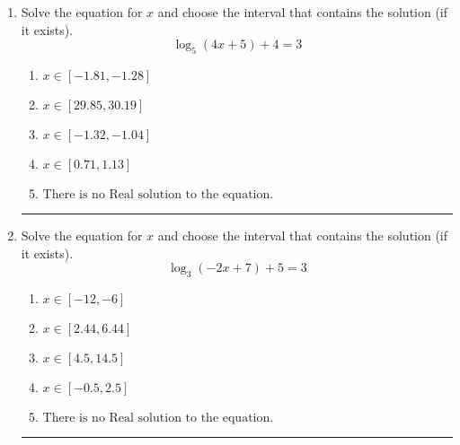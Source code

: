 \documentclass[14pt]{extbook}
\newcommand{\litem}[1]{\item#1\hspace*{-1cm}\rule{\textwidth}{0.4pt}}
\begin{document}
\begin{enumerate}
{\begin{enumerate}[label=\Alph*.]
\end{enumerate} }
\litem{
Solve the equation for $x$ and choose the interval that contains the solution (if it exists).\[ \log_{5}{(4x+5)}+4 = 3 \]\begin{enumerate}[label=\Alph*.]
\item \( x \in [-1.81, -1.28] \)
\item \( x \in [29.85, 30.19] \)
\item \( x \in [-1.32, -1.04] \)
\item \( x \in [0.71, 1.13] \)
\item \( \text{There is no Real solution to the equation.} \)

\end{enumerate} }
\litem{
Solve the equation for $x$ and choose the interval that contains the solution (if it exists).\[ \log_{3}{(-2x+7)}+5 = 3 \]\begin{enumerate}[label=\Alph*.]
\item \( x \in [-12, -6] \)
\item \( x \in [2.44, 6.44] \)
\item \( x \in [4.5, 14.5] \)
\item \( x \in [-0.5, 2.5] \)
\item \( \text{There is no Real solution to the equation.} \)

\end{enumerate} }
\end{enumerate}
\end{document}
